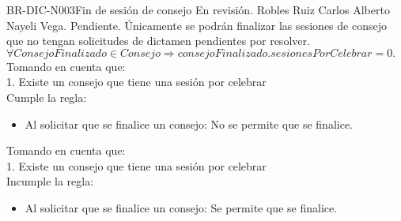 \begin{BusinessRule}{BR-DIC-N003}{Fin de sesión de consejo}{\bcAutorization}    %
	{\btEnabler}     %
	{\blControlling}    %
	\BRItem[Estado] En revisión.
	 Robles Ruiz Carlos Alberto
	 Nayeli Vega.
	 Pendiente.
	\BRItem[Descripción] Únicamente se podrán finalizar las sesiones de consejo que no tengan solicitudes de dictamen pendientes por resolver.
 	\BRItem[Sentencia] $\forall ConsejoFinalizado \in Consejo \Rightarrow consejoFinalizado.sesionesPorCelebrar= 0.$
		Tomando en cuenta que:\\
			 1. Existe un consejo que tiene una sesión por celebrar\\ 
	Cumple la regla:
	\begin{itemize}
		\item Al solicitar que se finalice un consejo: No se permite que se finalice.
	\end{itemize}
	Tomando en cuenta que:\\
			 1. Existe un consejo que tiene una sesión por celebrar\\ 
	Incumple la regla:
	\begin{itemize}
		\item Al solicitar que se finalice un consejo: Se permite que se finalice.
	\end{itemize}
\end{BusinessRule}
